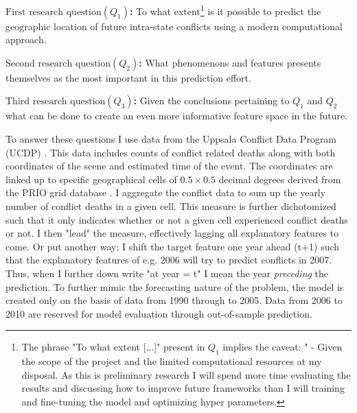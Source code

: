 \documentclass[a4paper]{article}
\begin{document}
\textbf{$\textrm{First research question} (Q_{1})$:} To what extent\footnote{The phrase "To what extent [...]" present in $Q_1$ implies the caveat: " - Given the scope of the project and the limited computational resources at my disposal. As this is preliminary research I will spend more time evaluating the results and discussing how to improve future frameworks than I will training and fine-tuning the model and optimizing hyper parameters.} is it possible to predict the geographic location of future intra-state conflicts using a modern computational approach.\par

\textbf{$\textrm{Second research question} (Q_{2})$:} What phenomenons and features presents themselves as the most important in this prediction effort.\par

\textbf{$\textrm{Third research question} (Q_{3})$:} Given the conclusions pertaining to $Q_1$ and $Q_2$ what can be done to create an even more informative feature space in the future.\par

To answer these questions I use data from the Uppsala Conflict Data Program (UCDP) \citep{Sundberg_2013, Croicu_Sundberg_2017}. This data includes counts of conflict related deaths along with both coordinates of the scene and estimated time of the event. The coordinates are linked up to specific geographical cells of $0.5 \times 0.5$ decimal degrees derived from the PRIO grid database \citep{Tollefsen_2012}. I aggregate the conflict data to sum up the yearly number of conflict deaths in a given cell. This measure is further dichotomized such that it only indicates whether or not a given cell experienced conflict deaths or not. I then "lead" the measure, effectively lagging all explanatory features to come. Or put another way; I shift the target feature one year ahead (t+1) such that the explanatory features of e.g. 2006 will try to predict conflicts in 2007. Thus, when I further down write "at year = t" I mean the year \emph{preceding} the prediction. To further mimic the forecasting nature of the problem, the model is created only on the basis of data from 1990 through to 2005. Data from 2006 to 2010 are reserved for model evaluation through out-of-sample prediction.\par
\end{document}
